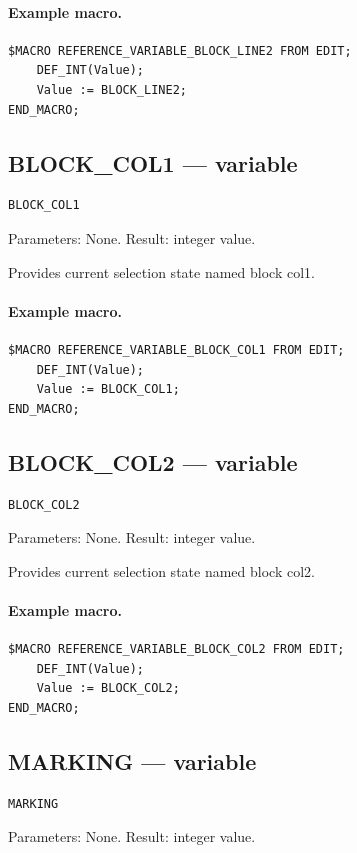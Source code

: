 \documentclass[a4paper,10pt,twoside,openany]{book}
\begin{document}
\paragraph{Example macro.}
\begin{verbatim}
$MACRO REFERENCE_VARIABLE_BLOCK_LINE2 FROM EDIT;
    DEF_INT(Value);
    Value := BLOCK_LINE2;
END_MACRO;
\end{verbatim}

\label{prim:variable-block-col1}
\subsection*{BLOCK\_COL1 --- variable}
\begin{verbatim}
BLOCK_COL1
\end{verbatim}
Parameters: None. Result: integer value.

Provides current selection state named block col1.

\paragraph{Example macro.}
\begin{verbatim}
$MACRO REFERENCE_VARIABLE_BLOCK_COL1 FROM EDIT;
    DEF_INT(Value);
    Value := BLOCK_COL1;
END_MACRO;
\end{verbatim}

\label{prim:variable-block-col2}
\subsection*{BLOCK\_COL2 --- variable}
\begin{verbatim}
BLOCK_COL2
\end{verbatim}
Parameters: None. Result: integer value.

Provides current selection state named block col2.

\paragraph{Example macro.}
\begin{verbatim}
$MACRO REFERENCE_VARIABLE_BLOCK_COL2 FROM EDIT;
    DEF_INT(Value);
    Value := BLOCK_COL2;
END_MACRO;
\end{verbatim}

\label{prim:variable-marking}
\subsection*{MARKING --- variable}
\begin{verbatim}
MARKING
\end{verbatim}
Parameters: None. Result: integer value.
\end{document}
